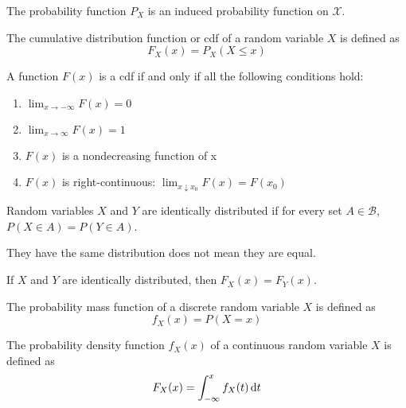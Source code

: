 The probability function $P_X$ is an induced probability function on $\mathcal{X}$.

\begin{definition}[cdf]
    The cumulative distribution function or cdf of a random variable $X$ is defined as
    \begin{equation}
        F_X (x) = P_X (X \leq x)
    \end{equation}
\end{definition}

\begin{theorem}
    A function $F(x)$ is a cdf if and only if all the following conditions hold:
    \begin{enumerate}
        \item $\displaystyle \lim_{x \rightarrow - \infty} F(x) = 0$
        \item $\displaystyle \lim_{x \rightarrow \infty} F(x) = 1$
        \item $F(x)$ is a nondecreasing function of x
        \item $F(x)$ is right-continuous: $\displaystyle \lim_{x \downarrow x_0} F(x) = F(x_0)$
    \end{enumerate}
\end{theorem}


\begin{definition}
    Random variables $X$ and $Y$ are identically distributed if for every set $A \in \mathcal{B}$, $P(X \in A) = P(Y \in A)$.
    
    They have the same distribution does not mean they are equal.
    
    If $X$ and $Y$ are identically distributed, then $F_X (x) = F_Y (x)$.
\end{definition}


\begin{definition}[pmf]
    The probability mass function of a discrete random variable $X$ is defined as
    \begin{equation}
        f_X (x) = P(X = x)
    \end{equation}
\end{definition}

\begin{definition}[pdf]
    The probability density function $f_X (x)$ of a continuous random variable $X$ is defined as 
    \begin{equation}
        F_X (x) = \int_{- \infty}^{x} f_X (t) \dif t
    \end{equation}
\end{definition}

